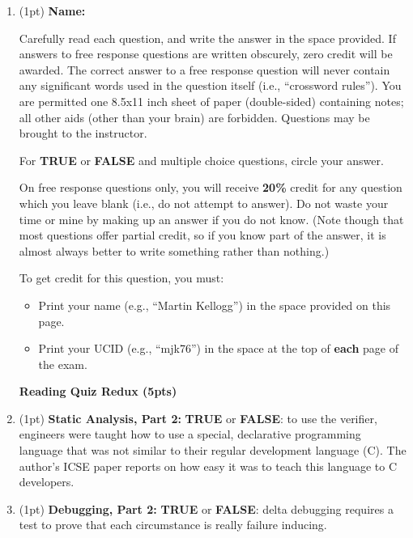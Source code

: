 \documentclass{report}
\newif\ifkey
\newcommand{\correct}[1]{\ifkey\color{red}\textbf{#1}\color{black}\else\textbf{#1}\fi\xspace}
\newcommand*{\pts}[1]{\addtocounter{points}{#1}(#1pt)}
\begin{document}
\begin{spacing}{1.4}

\begin{enumerate}[leftmargin=*]
\item \pts{1} \textbf{Name:} \hrulefill

Carefully read each question, and write the answer in the space
provided.  If answers to free response questions are written obscurely,
zero credit will be awarded. The correct answer to a free response question
will never contain any significant words used in the question itself (i.e., ``crossword rules'').
You are permitted one 8.5x11 inch sheet of paper (double-sided)
containing notes; all other aids (other than your brain) are forbidden.
Questions may be brought to the instructor.

For \textbf{TRUE} or \textbf{FALSE} and multiple choice questions,
circle your answer.

On free response questions only, you will receive \textbf{20\%} credit
for any question which you leave blank (i.e., do not attempt to
answer). Do not waste your time or mine by making up an answer if you
do not know. (Note though that most questions offer partial credit, so
if you know part of the answer, it is almost always better to write something
rather than nothing.)

To get credit for this question, you must:
\begin{itemize}
\item Print your name (e.g., ``Martin Kellogg'') in the space provided on this page.
\item Print your UCID (e.g., ``mjk76'') in the space at the top of \textbf{each} page of the exam.
\end{itemize}
  
\newpage

\textbf{Reading Quiz Redux (5pts)}

\item \pts{1}
  \textbf{Static Analysis, Part 2:} \textbf{TRUE} or
  \correct{FALSE}: to use the verifier, engineers were taught how to
  use a special, declarative programming language that was not similar
  to their regular development language (C). The author's ICSE paper
  reports on how easy it was to teach this language to C developers.

\item \pts{1}
  \textbf{Debugging, Part 2:} \correct{TRUE} or \textbf{FALSE}:
  delta debugging requires a test to prove that each circumstance is really failure inducing.


\end{enumerate}
\end{spacing}
\end{document}
